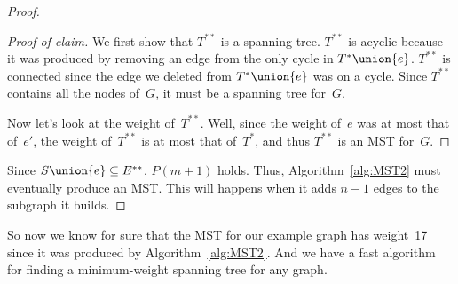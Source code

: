 \begin{proof}
\begin{proof}[Proof of claim]
We first show that $T^{**}$ is a spanning tree.  
$T^{**}$ is acyclic
because it was produced by removing an edge from the only cycle in
$T^{*} \union \{e\}$.
$T^{**}$ is connected
since the edge we deleted from $T^* \union \{e\}$ was on a cycle.
Since $T^{**}$ contains all the nodes of~$G$, it must be a spanning
tree for~$G$.

Now let's look at the weight of~$T^{**}$.  Well, since the weight
of~$e$ was at most that of~$e'$, the weight of~$T^{**}$ is at most
that of~$T^*$, and thus $T^{**}$ is an MST for~$G$.
\end{proof}

Since $S \union \{e\} \subseteq E^{**}$, $P(m + 1)$ holds.  Thus, 
Algorithm~\ref{alg:MST2} must eventually produce an MST\@.  This will
happens when it adds $n - 1$ edges to the subgraph it builds.
\end{proof}

So now we know for sure that the MST for our example graph has
weight~17 since it was produced by Algorithm~\ref{alg:MST2}.  And we
have a fast algorithm for finding a minimum-weight spanning tree for
any graph.

\begin{problems}
\classproblems
{}

\homeworkproblems
{}
\end{problems}


\begin{problems}
\classproblems
{}


\homeworkproblems
{}

\examproblems
{}

\end{problems}


\begin{problems}
\classproblems
{}

\examproblems
{}

\homeworkproblems
{}
\end{problems}


